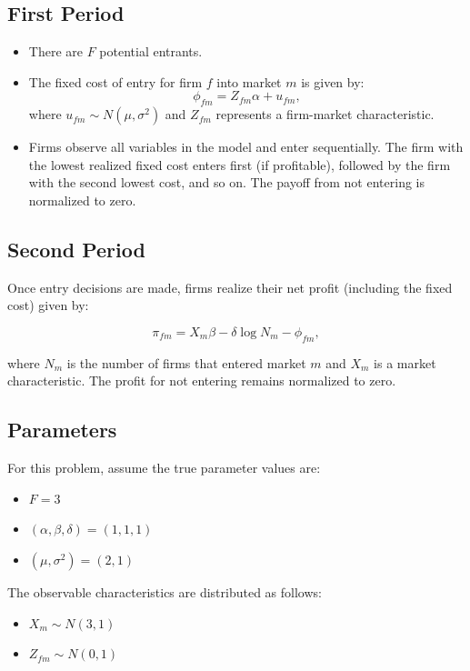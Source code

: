 \documentclass{article}
\begin{document}
\subsection{First Period}
\begin{itemize}
\item There are $F$ potential entrants.
\item The fixed cost of entry for firm $f$ into market $m$ is given by:
\begin{equation}
\phi_{fm} = Z_{fm} \alpha + u_{fm},
\end{equation}
where $u_{fm} \sim N (\mu, \sigma^2)$ and $Z_{fm}$ represents a firm-market characteristic.
\item Firms observe all variables in the model and enter sequentially. The firm with the lowest realized fixed cost enters first (if profitable), followed by the firm with the second lowest cost, and so on. The payoff from not entering is normalized to zero.
\end{itemize}

\subsection{Second Period}

Once entry decisions are made, firms realize their net profit (including the fixed cost) given by:

\begin{equation}
\pi_{fm} = X_m \beta - \delta \log N_m - \phi_{fm},
\end{equation}

where $N_m$ is the number of firms that entered market $m$ and $X_m$ is a market characteristic. The profit for not entering remains normalized to zero.

\subsection{Parameters}

For this problem, assume the true parameter values are:
\begin{itemize}
\item $F = 3$
\item $(\alpha, \beta, \delta) = (1, 1, 1)$
\item $(\mu, \sigma^2) = (2, 1)$
\end{itemize}

The observable characteristics are distributed as follows:
\begin{itemize}
\item $X_m \sim N (3, 1)$
\item $Z_{fm} \sim N (0, 1)$
\end{itemize}
\end{document}

